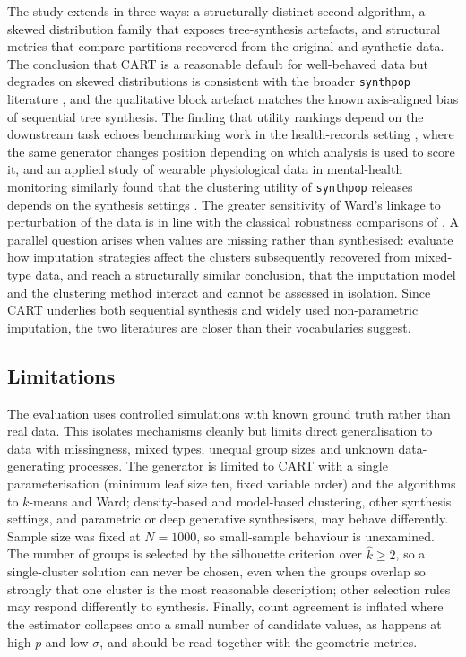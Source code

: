 \documentclass[pdflatex,sn-basic]{sn-jnl}
\begin{document}
The study extends \citet{chen2025} in three ways: a structurally distinct
second algorithm, a skewed distribution family that exposes tree-synthesis
artefacts, and structural metrics that compare partitions recovered from the
original and synthetic data. The conclusion that CART is a reasonable default
for well-behaved data but degrades on skewed distributions is consistent with
the broader \texttt{synthpop} literature \citep{nowok2016,snoke2018}, and the
qualitative block artefact matches the known axis-aligned bias of sequential
tree synthesis. The finding that utility rankings depend on the downstream task
echoes benchmarking work in the health-records setting
\citep{yan2022,elemam2022}, where the same generator changes position depending
on which analysis is used to score it, and an applied study of wearable
physiological data in mental-health monitoring similarly found that the
clustering utility of \texttt{synthpop} releases depends on the synthesis
settings \citep{vidiella2025}. The greater sensitivity of Ward's linkage to
perturbation of the data is in line with the classical robustness comparisons
of \citet{milligan1980}. A parallel question arises when values are missing
rather than synthesised: \citet{aschenbruck2023} evaluate how imputation
strategies affect the clusters subsequently recovered from mixed-type data, and
reach a structurally similar conclusion, that the imputation model and the
clustering method interact and cannot be assessed in isolation. Since CART
underlies both sequential synthesis and widely used non-parametric imputation,
the two literatures are closer than their vocabularies suggest.

\subsection{Limitations}
\label{sec:limitations}

The evaluation uses controlled simulations with known ground truth rather than
real data. This isolates mechanisms cleanly but limits direct generalisation to
data with missingness, mixed types, unequal group sizes and unknown
data-generating processes. The generator is limited to CART with a single
parameterisation (minimum leaf size ten, fixed variable order) and the
algorithms to $k$-means and Ward; density-based and model-based clustering,
other synthesis settings, and parametric or deep generative synthesisers, may
behave differently. Sample size was fixed at $N = 1000$, so small-sample
behaviour is unexamined. The number of groups is selected by the silhouette
criterion over $\hat{k} \ge 2$, so a single-cluster solution can never be
chosen, even when the groups overlap so strongly that one cluster is the most
reasonable description; other selection rules \citep{milligan1985} may
respond differently to synthesis. Finally, count agreement is inflated where
the estimator collapses onto a small number of candidate values, as happens at
high $p$ and low $\sigma$, and should be read together with the geometric
metrics.
\end{document}
